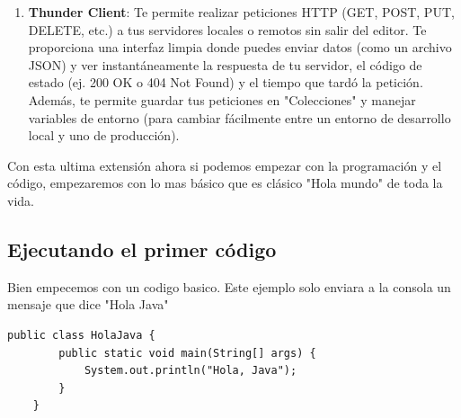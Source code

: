 \begin{enumerate}
\begin{itemize}
		\item \textbf{Spring Boot Dashboard}: Agrega un panel a la barra lateral de VS Code (un icono de una hojita, símbolo de Spring). Desde ahí, puedes ver todos los proyectos de Spring Boot que tienes en tu entorno de trabajo. Con simples botones interactivos puedes arrancar (Run), detener o depurar (Debug) cada servidor de forma independiente. Además, una vez que la aplicación está corriendo, el panel te mapea y te muestra todas las rutas REST (URLs de tus endpoints) que están activas para que sepas exactamente qué servicios levantaste.
	\end{itemize}
	\item \textbf{Thunder Client}: Te permite realizar peticiones HTTP (GET, POST, PUT, DELETE, etc.) a tus servidores locales o remotos sin salir del editor. Te proporciona una interfaz limpia donde puedes enviar datos (como un archivo JSON) y ver instantáneamente la respuesta de tu servidor, el código de estado (ej. 200 OK o 404 Not Found) y el tiempo que tardó la petición. Además, te permite guardar tus peticiones en "Colecciones" y manejar variables de entorno (para cambiar fácilmente entre un entorno de desarrollo local y uno de producción).
\end{enumerate}
Con esta ultima extensión ahora si podemos empezar con la programación y el código, empezaremos con lo mas básico que es clásico "Hola mundo" de toda la vida.
\subsection{Ejecutando el primer código}

Bien empecemos con un codigo basico. Este ejemplo solo enviara a la consola un mensaje que dice "Hola Java"


\begin{lstlisting}[caption=Ejemplo de código Java]
	public class HolaJava {
		public static void main(String[] args) {
			System.out.println("Hola, Java"); 
		}
	}
\end{lstlisting}
